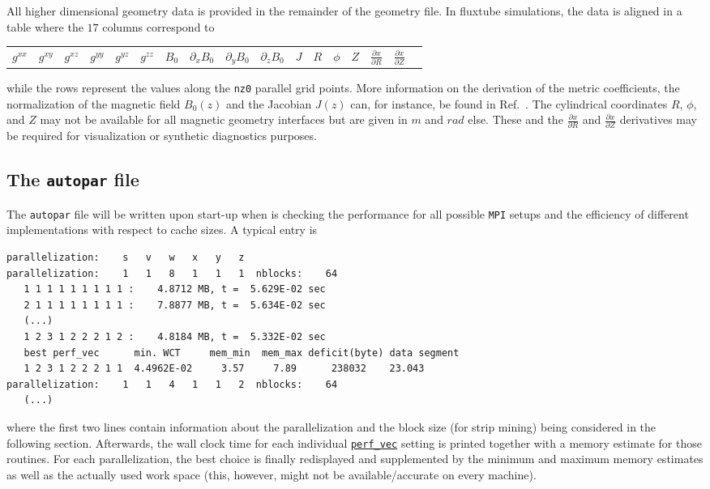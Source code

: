 \documentclass[12pt]{article}
\begin{document}
All higher dimensional geometry data is provided in the remainder of the geometry file.
In fluxtube simulations, the data is aligned in a table where the $17$ columns correspond to
\begin{center}
\scriptsize
\begin{tabular}{ccccccccccccccccc}
$g^{xx}$ & $g^{xy}$ & $g^{xz}$ & $g^{yy}$ & $g^{yz}$ & $g^{zz}$ & $B_0$ & $\partial_x B_0$ & $\partial_y B_0$ &
$\partial_z B_0$ & $J$ & $R$ & $\phi$ & $Z$ & $\frac{\partial x}{\partial R}$ & $\frac{\partial x}{\partial Z}$
\end{tabular}
\end{center}
while the rows represent the values along the {\tt nz0} parallel grid points. More information
on the derivation of the metric coefficients, the normalization of the magnetic field $B_0(z)$ and the Jacobian
$J(z)$ can, for instance, be found in Ref.~\cite{ToldPhD}. The cylindrical coordinates $R$, $\phi$, and $Z$
may not be available for all magnetic geometry interfaces but are given in $m$ and $rad$ else.
These and the $\frac{\partial x}{\partial R}$ and $\frac{\partial x}{\partial Z}$ derivatives may be
required for visualization or synthetic diagnostics purposes.


\subsection{The \texttt{autopar} file}
\label{subsec:autopar-file}

The {\tt autopar} file will be written upon start-up when \gene is checking the performance for
all possible {\tt MPI} setups and the efficiency of different implementations with respect to cache sizes.
A typical entry is
{\scriptsize
\begin{verbatim}
parallelization:    s   v   w   x   y   z
parallelization:    1   1   8   1   1   1  nblocks:    64
   1 1 1 1 1 1 1 1 1 :    4.8712 MB, t =  5.629E-02 sec
   2 1 1 1 1 1 1 1 1 :    7.8877 MB, t =  5.634E-02 sec
   (...)
   1 2 3 1 2 2 2 1 2 :    4.8184 MB, t =  5.332E-02 sec
   best perf_vec      min. WCT     mem_min  mem_max deficit(byte) data segment
   1 2 3 1 2 2 2 1 1  4.4962E-02     3.57     7.89      238032    23.043
parallelization:    1   1   4   1   1   2  nblocks:    64
   (...)
\end{verbatim}}
where the first two lines contain information about the parallelization and the block size (for
strip mining) being considered in the following section. Afterwards, the wall clock time for each
individual \hyperlink{perf_vec}{\tt perf\_vec} setting is printed together with a memory estimate
for those routines. For each parallelization, the best choice is finally redisplayed and
supplemented by the minimum and maximum memory estimates as well as the actually used work space
(this, however, might not be available/accurate on every machine).
\end{document}
